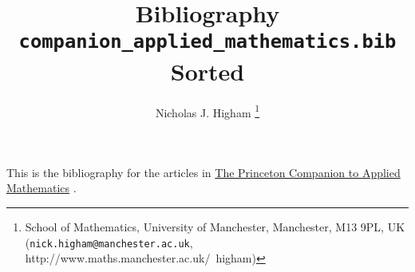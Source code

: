 \documentclass[12pt]{article}
\title{Bibliography \texttt{companion\_applied\_mathematics.bib} Sorted}
\author{Nicholas J. Higham%
        \thanks{%
                School of Mathematics,
                University of Manchester,
                Manchester, M13 9PL, UK 
                (\texttt{nick.higham@manchester.ac.uk},
                http://www.maths.manchester.ac.uk/\string~higham)
               }
}
\begin{document}
\maketitle

This is the bibliography for the articles in 
\href{http://www.ma.man.ac.uk/~higham/pcam/index.php}{The Princeton Companion to Applied Mathematics} \cite{higham15PCAM}.

\nocite{*}



\end{document}
